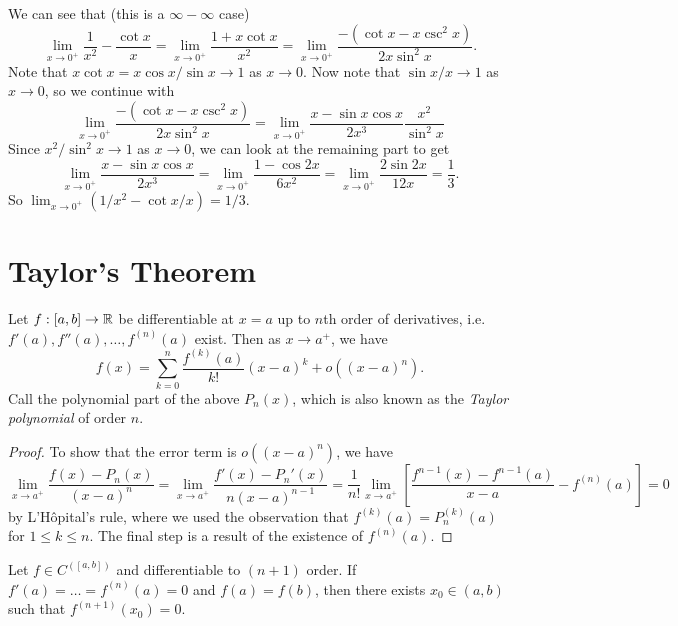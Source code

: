 \begin{example}
  We can see that (this is a $\infty - \infty$ case)
  \[
    \lim_{x \to 0^+} \frac{1}{x^2} - \frac{\cot x}{x}
    = \lim_{x \to 0^+} \frac{1 + x \cot x}{x^2}
    = \lim_{x \to 0^+} \frac{-(\cot x - x \csc^2 x)}{2x \sin^2 x}.
  \]
  Note that $x \cot x = x \cos x / \sin x \to 1$ as
  $x \to 0$. Now note that $\sin x / x \to 1$ as $x \to 0$,
  so we continue with
  \[
    \lim_{x \to 0^+} \frac{-(\cot x - x \csc^2 x)}{2x \sin^2 x}
    = \lim_{x \to 0^+} \frac{x - \sin x \cos x}{2x^3} \frac{x^2}{\sin^2 x}
  \]
  Since $x^2 / \sin^2 x \to 1$ as $x \to 0$, we can
  look at the remaining part to get
  \[
    \lim_{x \to 0^+} \frac{x - \sin x \cos x}{2x^3}
    = \lim_{x \to 0^+} \frac{1 - \cos 2x}{6x^2}
    = \lim_{x \to 0^+} \frac{2 \sin 2x}{12x} = \frac{1}{3}.
  \]
  So $\lim_{x \to 0^+} (1 / x^2 - \cot x / x) = 1 / 3$.
\end{example}

\section{Taylor's Theorem}
\begin{theorem}
  Let $f : [a, b] \to \mathbb{R}$ be differentiable at $x = a$
  up to $n$th order of derivatives, i.e.
  $f'(a), f''(a), \dots, f^{(n)}(a)$ exist. Then as
  $x \to a^+$, we have
  \[f(x) = \sum_{k = 0}^n \frac{f^(k)(a)}{k!}(x - a)^k + o((x - a)^n).\]
  Call the polynomial part of the above $P_n(x)$, which
  is also known as the \emph{Taylor polynomial} of order $n$.
\end{theorem}

\begin{proof}
  To show that the error term is $o((x - a)^n)$, we have
  \[
    \lim_{x \to a^+} \frac{f(x) - P_n(x)}{(x - a)^n}
    = \lim_{x \to a^+} \frac{f'(x) - P_n'(x)}{n(x - a)^{n - 1}}
    = \frac{1}{n!} \lim_{x \to a^+} \left[\frac{f^{n - 1}(x) - f^{n - 1}(a)}{x - a} - f^{(n)}(a)\right] = 0
  \]
  by L'H\^opital's rule, where we used the observation
  that
  $f^{(k)}(a) = P_n^{(k)}(a)$ for $1 \le k \le n$.
  The final step is a result of the existence of $f^{(n)}(a)$.
\end{proof}

\begin{lemma}
  Let $f \in C^([a, b])$ and differentiable to
  $(n + 1)$ order. If $f'(a) = \dots = f^{(n)}(a) = 0$
  and $f(a) = f(b)$, then there exists $x_0 \in (a, b)$
  such that $f^{(n + 1)}(x_0) = 0$.
\end{lemma}

